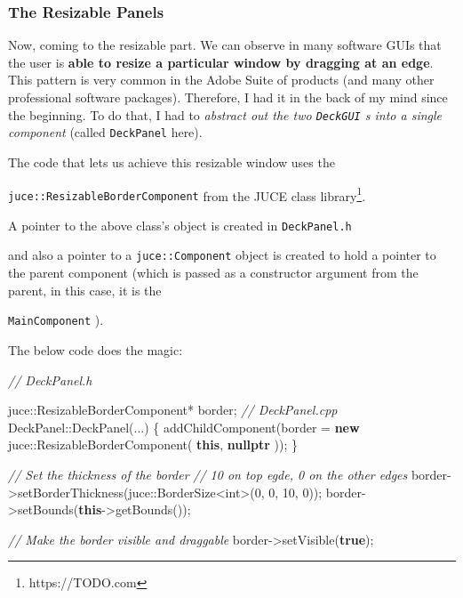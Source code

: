 \documentclass[12pt,]{article}
\newenvironment{Shaded}{}{}
\newcommand{\CommentTok}[1]{\textcolor[rgb]{0.38,0.63,0.69}{\textit{#1}}}
\newcommand{\DataTypeTok}[1]{\textcolor[rgb]{0.56,0.13,0.00}{#1}}
\newcommand{\DecValTok}[1]{\textcolor[rgb]{0.25,0.63,0.44}{#1}}
\newcommand{\KeywordTok}[1]{\textcolor[rgb]{0.00,0.44,0.13}{\textbf{#1}}}
\newcommand{\NormalTok}[1]{#1}
\let\oldtexttt\texttt
\renewcommand{\texttt}[1]{
  \colorbox{bgcolor}{\oldtexttt{#1}}
}
\begin{document}
\hypertarget{the-resizable-panels}{%
\subsubsection{The Resizable Panels}\label{the-resizable-panels}}

Now, coming to the resizable part. We can observe in many software GUIs
that the user is \textbf{able to resize a particular window by dragging
at an edge}. This pattern is very common in the Adobe Suite of products
(and many other professional software packages). Therefore, I had it in
the back of my mind since the beginning. To do that, I had to
\emph{abstract out the two \texttt{DeckGUI}s into a single component}
(called \texttt{DeckPanel} here).

The code that lets us achieve this resizable window uses the
\texttt{juce::ResizableBorderComponent} from the JUCE class
library\footnote{https://TODO.com}.

A pointer to the above class's object is created in \texttt{DeckPanel.h}
and also a pointer to a \texttt{juce::Component} object is created to
hold a pointer to the parent component (which is passed as a constructor
argument from the parent, in this case, it is the
\texttt{MainComponent}).

The below code does the magic:

\begin{Shaded}
\begin{Highlighting}[]
\CommentTok{// DeckPanel.h}

\NormalTok{juce::ResizableBorderComponent* border;}
\CommentTok{// DeckPanel.cpp}
\NormalTok{DeckPanel::DeckPanel(...) \{}
\NormalTok{    addChildComponent(border = }\KeywordTok{new}\NormalTok{ juce::ResizableBorderComponent(}
        \KeywordTok{this}\NormalTok{,}
        \KeywordTok{nullptr}
\NormalTok{    ));}
\NormalTok{\}}

\CommentTok{// Set the thickness of the border}
\CommentTok{// 10 on top egde, 0 on the other edges}
\NormalTok{border->setBorderThickness(juce::BorderSize<}\DataTypeTok{int}\NormalTok{>(}\DecValTok{0}\NormalTok{, }\DecValTok{0}\NormalTok{, }\DecValTok{10}\NormalTok{, }\DecValTok{0}\NormalTok{));}
\NormalTok{border->setBounds(}\KeywordTok{this}\NormalTok{->getBounds());}

\CommentTok{// Make the border visible and draggable}
\NormalTok{border->setVisible(}\KeywordTok{true}\NormalTok{);}
\end{Highlighting}
\end{Shaded}
\end{document}
